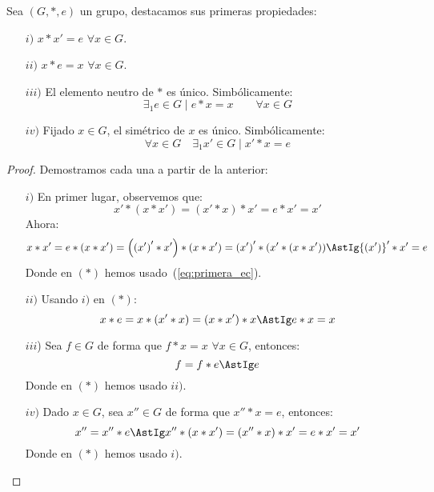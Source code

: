 \begin{prop}
    Sea $(G,\ast,e)$ un grupo, destacamos sus primeras propiedades:
    \begin{enumerate}
        \item[$i)$] $x\ast x' = e$ $\forall x\in G$.
        \item[$ii)$] $x\ast e = x$ $\forall x\in G$.
        \item[$iii)$] El elemento neutro de $\ast$ es único. Simbólicamente:
            \begin{equation*}
                \exists_1 e\in G \mid e\ast x = x \qquad \forall x\in G
            \end{equation*}
        \item[$iv)$] Fijado $x\in G$, el simétrico de $x$ es único. Simbólicamente:
            \begin{equation*}
                \forall x\in G \quad \exists_1 x' \in G \mid x' \ast x = e
            \end{equation*}
    \end{enumerate}
    \begin{proof}
        Demostramos cada una a partir de la anterior:
        \begin{enumerate}
            \item[$i)$] En primer lugar, observemos que:
                \begin{equation}\label{eq:primera_ec}
                    x'\ast (x\ast x') = (x'\ast x) \ast x' = e \ast x' = x'
                \end{equation}
                Ahora:
                \begin{equation*}
                    x\ast x' = e\ast (x \ast x') = \left({(x')}'\ast x'\right) \ast (x\ast x') = {(x')}' \ast (x'\ast (x\ast x')) \AstIg {(x')}' \ast x' = e
                \end{equation*}
                Donde en $(\ast)$ hemos usado~(\ref{eq:primera_ec}).
            \item[$ii)$] Usando $i)$ en $(\ast)$:
                \begin{equation*}
                    x\ast e = x\ast (x' \ast x) = (x \ast x') \ast x \AstIg e \ast x = x
                \end{equation*}
            \item[$iii$)] Sea $f\in G$ de forma que $f\ast x = x$ $\forall x\in G$, entonces:
                \begin{equation*}
                    f = f \ast e \AstIg e
                \end{equation*}
                Donde en $(\ast)$ hemos usado $ii)$.
            \item[$iv)$] Dado $x\in G$, sea $x'' \in G$ de forma que $x'' \ast x = e$, entonces:
                \begin{equation*}
                    x '' = x'' \ast e \AstIg x '' \ast (x \ast x') = (x '' \ast x) \ast x' = e \ast x' = x'
                \end{equation*}
                Donde en $(\ast)$ hemos usado $i)$.
        \end{enumerate}
    \end{proof}
\end{prop}

